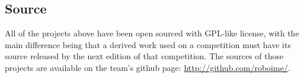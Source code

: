 \subsection{Source}

All of the projects above have been open sourced with GPL-like license, with the main difference being that a derived work used on a competition must have its source released by the next edition of that competition. The sources of those projects are available on the team's github page: \url{http://github.com/roboime/}.
